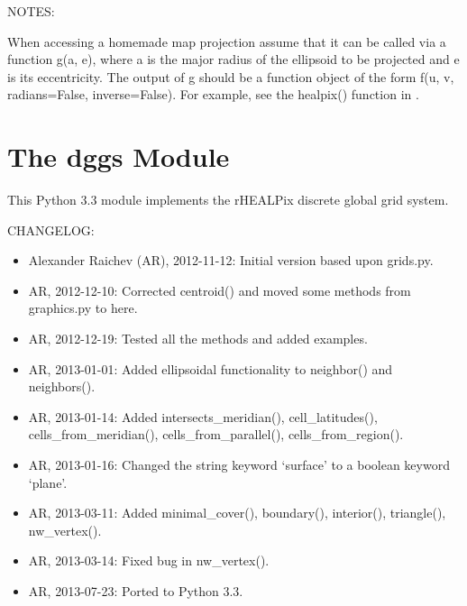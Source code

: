 \documentclass[a4paper,12ptopenany,oneside]{sphinxmanual}
\begin{document}
\begin{fulllineitems}
NOTES:

When accessing a homemade map projection assume that it can be called via
a function g(a, e), where a is the major radius of the ellipsoid to be 
projected and e is its eccentricity.
The output of g should be a function object of the form 
f(u, v, radians=False, inverse=False).
For example, see the healpix() function in .

\end{fulllineitems}



\chapter{The dggs Module}
\label{dggs::doc}\label{dggs:module-rhealpix_dggs.dggs}\label{dggs:the-dggs-module}
This Python 3.3 module implements the rHEALPix discrete global grid system.

CHANGELOG:
\begin{itemize}
\item {} 
Alexander Raichev (AR), 2012-11-12: Initial version based upon grids.py.

\item {} 
AR, 2012-12-10: Corrected centroid() and moved some methods from graphics.py to here.

\item {} 
AR, 2012-12-19: Tested all the methods and added examples.

\item {} 
AR, 2013-01-01: Added ellipsoidal functionality to neighbor() and neighbors().

\item {} 
AR, 2013-01-14: Added intersects\_meridian(), cell\_latitudes(), cells\_from\_meridian(), cells\_from\_parallel(), cells\_from\_region().

\item {} 
AR, 2013-01-16: Changed the string keyword `surface' to a boolean keyword `plane'.

\item {} 
AR, 2013-03-11: Added minimal\_cover(), boundary(), interior(), triangle(), nw\_vertex().

\item {} 
AR, 2013-03-14: Fixed bug in nw\_vertex().

\item {} 
AR, 2013-07-23: Ported to Python 3.3.

\end{itemize}
\end{document}
